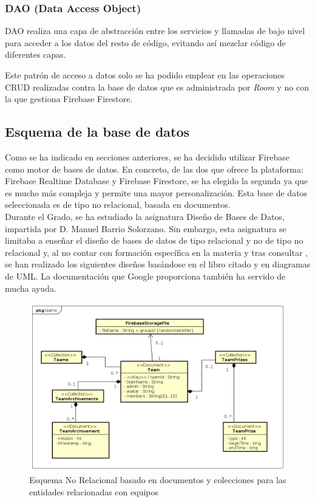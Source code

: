 \documentclass[twoside]{report}
\begin{document}
\subsubsection{DAO (Data Access Object)}

DAO realiza una capa de abstracción entre los servicios y llamadas de bajo nivel para acceder a los datos del resto de código, evitando así mezclar código de diferentes capas.

Este patrón de acceso a datos solo se ha podido emplear en las operaciones CRUD realizadas contra la base de datos que es administrada por \textit{Room} \cite{roompersistence} y no con la que gestiona Firebase Firestore.


\subsection{Esquema de la base de datos}
Como se ha indicado en secciones anteriores, se ha decidido utilizar Firebase como motor de bases de datos. En concreto, de las dos que ofrece la plataforma: Firebase Realtime Database y Firebase Firestore, se ha elegido la segunda ya que es mucho más compleja y permite una mayor personalización. Esta base de datos seleccionada es de tipo no relacional, basada en documentos. \\

Durante el Grado, se ha estudiado la asignatura Diseño de Bases de Datos, impartida por D. Manuel Barrio Solorzano. Sin embargo, esta asignatura se limitaba a enseñar el diseño de bases de datos de tipo relacional y no de tipo no relacional y, al no contar con formación específica en la materia y tras consultar \cite{databasedesign}, se han realizado los siguientes diseños basándose en el libro citado y en diagramas de UML. La documentación que Google proporciona \cite{fireference} también ha servido de mucha ayuda.

\begin{figure}[H]
\centering
\includegraphics[scale=0.5]{images/databaseNRteams}
\caption{Esquema No Relacional basado en documentos y colecciones para las entidades relacionadas con equipos}
\end{figure}
\end{document}

